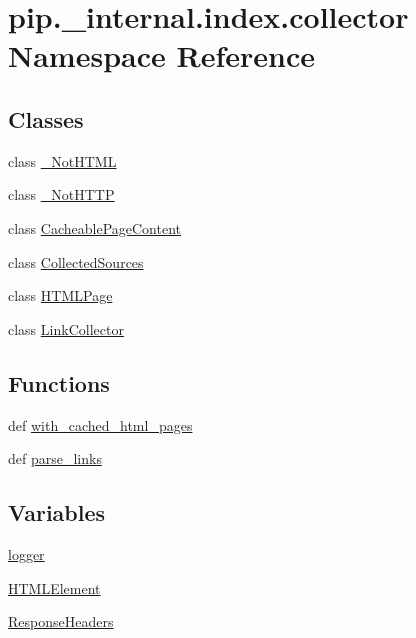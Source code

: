 \hypertarget{namespacepip_1_1__internal_1_1index_1_1collector}{}\section{pip.\+\_\+internal.\+index.\+collector Namespace Reference}
\label{namespacepip_1_1__internal_1_1index_1_1collector}
\subsection*{Classes}
\begin{DoxyCompactItemize}
\item 
class \hyperlink{classpip_1_1__internal_1_1index_1_1collector_1_1__NotHTML}{\+\_\+\+Not\+H\+T\+ML}
\item 
class \hyperlink{classpip_1_1__internal_1_1index_1_1collector_1_1__NotHTTP}{\+\_\+\+Not\+H\+T\+TP}
\item 
class \hyperlink{classpip_1_1__internal_1_1index_1_1collector_1_1CacheablePageContent}{Cacheable\+Page\+Content}
\item 
class \hyperlink{classpip_1_1__internal_1_1index_1_1collector_1_1CollectedSources}{Collected\+Sources}
\item 
class \hyperlink{classpip_1_1__internal_1_1index_1_1collector_1_1HTMLPage}{H\+T\+M\+L\+Page}
\item 
class \hyperlink{classpip_1_1__internal_1_1index_1_1collector_1_1LinkCollector}{Link\+Collector}
\end{DoxyCompactItemize}
\subsection*{Functions}
\begin{DoxyCompactItemize}
\item 
def \hyperlink{namespacepip_1_1__internal_1_1index_1_1collector_ae21a08555b21395eb418123afd633461}{with\+\_\+cached\+\_\+html\+\_\+pages}
\item 
def \hyperlink{namespacepip_1_1__internal_1_1index_1_1collector_a28eb0dc89ccd069ebee3f7d6e5f1ca8c}{parse\+\_\+links}
\end{DoxyCompactItemize}
\subsection*{Variables}
\begin{DoxyCompactItemize}
\item 
\hyperlink{namespacepip_1_1__internal_1_1index_1_1collector_aa06c5ddfbbe781a2898e18ced297b032}{logger}
\item 
\hyperlink{namespacepip_1_1__internal_1_1index_1_1collector_aebd799a8209e5584270b728dfcbd8d48}{H\+T\+M\+L\+Element}
\item 
\hyperlink{namespacepip_1_1__internal_1_1index_1_1collector_a248367a642c596833022d146d90c48b3}{Response\+Headers}
\end{DoxyCompactItemize}


